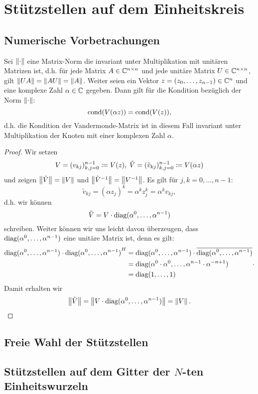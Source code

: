 \chapter{Stützstellen auf dem Einheitskreis}
\section{Numerische Vorbetrachungen}

\begin{lemma}
    Sei $\left\lVert \cdot \right\rVert$ eine Matrix-Norm die invariant unter Multiplikation mit unitären
    Matrizen ist, d.h. für jede Matrix $A \in \mathbb{C}^{n\times n}$ und jede
    unitäre Matrix $U \in \mathbb{C}^{n\times n}$, gilt $\left\lVert UA \right\rVert = \left\lVert AU \right\rVert = \left\lVert A \right\rVert$.
    Weiter seien ein Vektor $z = (z_0, \dots, z_{n-1}) \in \mathbb{C}^n$ und eine
    komplexe Zahl $\alpha \in \mathbb{C}$ gegeben.
    Dann gilt für die Kondition bezüglich der Norm $\left\lVert \cdot \right\rVert$:
    \[
        \text{cond$(\text{$V(\alpha z)$})$} = \text{cond$(\text{$V(z)$})$},
    \]
    d.h. die Kondition der Vandermonde-Matrix ist in diesem Fall invariant
    unter Multiplikation der Knoten mit einer komplexen Zahl $\alpha$.
\end{lemma}

\begin{proof}
    Wir setzen
    \[
        V = (v_{kj})_{k,j=0}^{n-1} \coloneqq \text{$V(z)$}, \;
        \tilde{V} = (\tilde{v}_{kj})_{k,j=0}^{n-1} \coloneqq \text{$V(\alpha z)$}
    \]
    und zeigen $\left\lVert \tilde{V} \right\rVert = \left\lVert V \right\rVert$ und
    $\left\lVert \tilde{V}^{-1} \right\rVert = \left\lVert V^{-1} \right\rVert$.
    Es gilt für $j,k = 0,\dots,n-1$:
    \[
        \tilde{v}_{kj} = (\alpha z_j)^k = \alpha^k z_j^k = \alpha^k v_{kj},
    \]
    d.h. wir können
    \[
        \tilde{V} = V \cdot \text{diag$(\alpha^0, \dots, \alpha^{n-1})$}
    \]
    schreiben.
    Weiter können wir uns leicht davon überzeugen, dass $\text{diag$(\alpha^0, \dots,
    \alpha^{n-1})$}$ eine unitäre Matrix ist, denn es gilt:
    \[
        \begin{split}
            \text{diag$(\alpha^0, \dots, \alpha^{n-1})$} \cdot \text{diag$(\alpha^0, \dots, \alpha^{n-1})$}^{H}
            &= \text{diag$(\alpha^0, \dots, \alpha^{n-1})$} \cdot \overline{\text{diag$(\alpha^0, \dots, \alpha^{n-1})$}}\\
            &= \text{diag$(\alpha^0 \cdot \alpha^0, \dots, \alpha^{n-1} \cdot \alpha^{-n+1})$}\\
            &= \text{diag$(1, \dots, 1)$}
        \end{split}.
    \]
    Damit erhalten wir
    \[
        \left\lVert \tilde{V} \right\rVert = \left\lVert V \cdot \text{diag$(\alpha^0, \dots, \alpha^{n-1})$} \right\rVert = \left\lVert V \right\rVert.
    \]
\end{proof}

\section{Freie Wahl der Stützstellen}
\section{Stützstellen auf dem Gitter der $N$-ten Einheitswurzeln}
